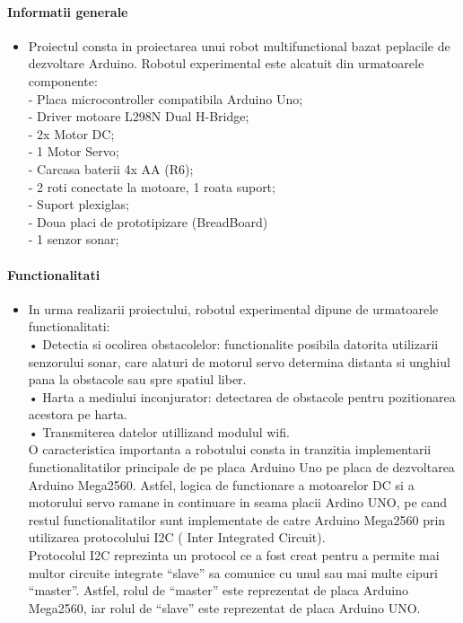 \newcommand\tab[1][1cm]{\hspace*{#1}}
\graphicspath{ {images/} }
\paragraph{Informatii generale}
\begin{itemize}
\item
	\tab Proiectul consta in proiectarea unui robot multifunctional bazat peplacile de dezvoltare Arduino. Robotul experimental este alcatuit din urmatoarele componente:\\
-	Placa microcontroller compatibila Arduino Uno;\\
-	Driver motoare L298N Dual H-Bridge;\\
-	2x Motor DC;\\
-	1 Motor Servo;\\
-	Carcasa baterii 4x AA (R6);\\
-	2 roti conectate la motoare, 1 roata suport;\\
-	Suport plexiglas;\\
-	Doua placi de prototipizare (BreadBoard)\\
-	1 senzor sonar;\\
\end{itemize}

\paragraph{\bf{Functionalitati}}
\begin{itemize}
\item
	\tab In urma realizarii proiectului, robotul experimental dipune de urmatoarele functionalitati:\\
•	Detectia si ocolirea obstacolelor: functionalite posibila datorita utilizarii senzorului sonar, care alaturi de motorul servo determina distanta si unghiul pana la obstacole sau spre spatiul liber.\\
•	Harta a mediului inconjurator:  detectarea de obstacole pentru pozitionarea acestora pe harta.\\
•	Transmiterea datelor utillizand modulul wifi.\\

	\tab O caracteristica importanta a robotului consta in tranzitia implementarii functionalitatilor principale de pe placa Arduino Uno pe placa de dezvoltarea Arduino Mega2560. Astfel, logica de functionare a motoarelor DC si a motorului servo ramane in continuare in seama placii Ardino UNO, pe cand restul functionalitatilor sunt implementate de catre Arduino Mega2560 prin utilizarea protocolului I2C ( Inter Integrated Circuit). \\
	\tab Protocolul I2C reprezinta un protocol ce a fost creat pentru a permite mai multor circuite integrate “slave” sa comunice cu unul sau mai multe cipuri “master”.  Astfel, rolul de “master” este reprezentat de placa  Arduino Mega2560, iar rolul de “slave” este reprezentat de placa Arduino UNO.\\

\end{itemize}